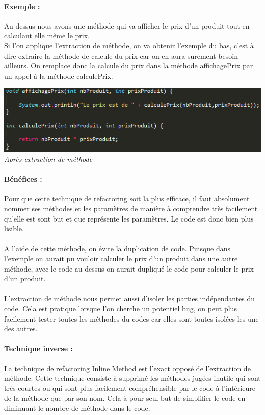 \documentclass[a4paper,twoside,12pt,openright]{report}
\begin{document}
\paragraph{Exemple :} 
Au dessus nous avons une méthode qui va afficher le prix d'un produit tout en calculant elle même le prix.\\
Si l'on applique l'extraction de méthode, on va obtenir l'exemple du bas, c'est à dire extraire la méthode de calcule du prix car on en aura surement besoin ailleurs. On remplace donc la calcule du prix dans la méthode affichagePrix par un appel à la méthode calculePrix.\\
\begin{center}
\includegraphics[scale=1]{Image/Extraction_Methode2.png}\\
\itshape{Après extraction de méthode}
\end{center}
\paragraph{Bénéfices :}
Pour que cette technique de refactoring soit la plus efficace, il faut absolument nommer ses méthodes et les paramètres de manière à comprendre très facilement qu'elle est sont but et que représente les paramètres. Le code est donc bien plus lisible.\\\\
A l'aide de cette méthode, on évite la duplication de code. Puisque dans l'exemple on aurait pu vouloir calculer le prix d'un produit dans une autre méthode, avec le code au dessus on aurait dupliqué le code pour calculer le prix d'un produit.\\\\
L'extraction de méthode nous permet aussi d'isoler les parties indépendantes du code. Cela est pratique lorsque l'on cherche un potentiel bug, on peut plus facilement tester toutes les méthodes du codes car elles sont toutes isolées les une des autres.

\paragraph{Technique inverse :}
La technique de refactoring Inline Method est l'exact opposé de l'extraction de méthode. Cette technique consiste à supprimé les méthodes jugées inutile qui sont très courtes ou qui sont plus facilement compréhensible par le code à l'intérieure de la méthode que par son nom. Cela à pour seul but de simplifier le code en diminuant le nombre de méthode dans le code.
\end{document}
